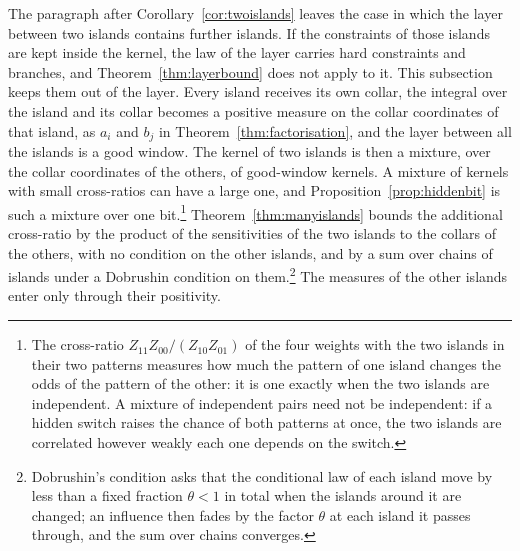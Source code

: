 \documentclass[11pt]{amsart}
\theoremstyle{definition}
\theoremstyle{remark}
\numberwithin{equation}{section}
\begin{document}
The paragraph after Corollary~\ref{cor:twoislands} leaves the case in which
the layer between two islands contains further islands. If the constraints
of those islands are kept inside the kernel, the law of the layer carries
hard constraints and branches, and Theorem~\ref{thm:layerbound} does not
apply to it. This subsection keeps them out of the layer. Every island
receives its own collar, the integral over the island and its collar
becomes a positive measure on the collar coordinates of that island, as
$a_i$ and $b_j$ in Theorem~\ref{thm:factorisation}, and the layer between
all the islands is a good window. The kernel of two islands is then a
mixture, over the collar coordinates of the others, of good-window
kernels. A mixture of kernels with small cross-ratios can have a large
one, and Proposition~\ref{prop:hiddenbit} is such a mixture over one bit.\footnote{The cross-ratio $Z_{11}Z_{00}/(Z_{10}Z_{01})$ of the four
weights with the two islands in their two patterns measures how much the
pattern of one island changes the odds of the pattern of the other: it is
one exactly when the two islands are independent. A mixture of independent
pairs need not be independent: if a hidden switch raises the chance of both
patterns at once, the two islands are correlated however weakly each one
depends on the switch.}
Theorem~\ref{thm:manyislands} bounds the additional cross-ratio by the
product of the sensitivities of the two islands to the collars of the
others, with no condition on the other islands, and by a sum over chains
of islands under a Dobrushin condition on them.\footnote{Dobrushin's
condition asks that the conditional law of each island move by less than a
fixed fraction $\theta<1$ in total when the islands around it are changed;
an influence then fades by the factor $\theta$ at each island it passes
through, and the sum over chains converges.} The measures of the other
islands enter only through their positivity.
\end{document}
